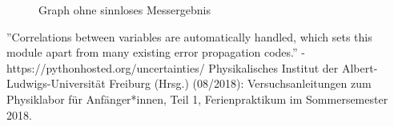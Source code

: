 \documentclass[11pt,a4paper]{article}
\begin{document}
\begin{figure}[p]
\centering
{}
\renewcommand\thefigure{2}
\caption[Graph ohne sinnloses Messergebnis]{Graph ohne sinnloses Messergebnis}
\label{Abb:2}
\end{figure}

\begin{thebibliography}{9}
''Correlations between variables are automatically handled, which sets this module apart from many existing error propagation codes.'' - https://pythonhosted.org/uncertainties/
 Physikalisches Institut der Albert-Ludwigs-Universität Freiburg (Hrsg.) (08/2018): Versuchsanleitungen zum Physiklabor für Anfänger*innen, Teil 1, Ferienpraktikum im Sommersemester 2018.
\end{thebibliography}
\end{document}
